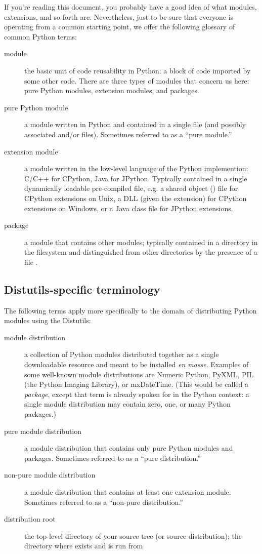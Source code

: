 \documentclass{howto}
\begin{document}
If you're reading this document, you probably have a good idea of what
modules, extensions, and so forth are.  Nevertheless, just to be sure
that everyone is operating from a common starting point, we offer the
following glossary of common Python terms:
\begin{description}
\item[module] the basic unit of code reusability in Python: a block of
  code imported by some other code.  There are three types of modules
  that concern us here: pure Python modules, extension modules, and
  packages.
\item[pure Python module] a module written in Python and contained in a
  single  file (and possibly associated  and/or
   files).  Sometimes referred to as a ``pure module.''
\item[extension module] a module written in the low-level language of
  the Python implemention: C/C++ for CPython, Java for JPython.
  Typically contained in a single dynamically loadable pre-compiled
  file, e.g. a shared object () file for CPython extensions on
  Unix, a DLL (given the  extension) for CPython extensions
  on Windows, or a Java class file for JPython extensions.
\item[package] a module that contains other modules; typically contained
  in a directory in the filesystem and distinguished from other
  directories by the presence of a file .
\end{description}


\subsection{Distutils-specific terminology}
\label{sec:distutils-term}

The following terms apply more specifically to the domain of
distributing Python modules using the Distutils:
\begin{description}
\item[module distribution] a collection of Python modules distributed
  together as a single downloadable resource and meant to be installed
  \emph{en masse}.  Examples of some well-known module distributions are
  Numeric Python, PyXML, PIL (the Python Imaging Library), or
  mxDateTime.  (This would be called a \emph{package}, except that term
  is already spoken for in the Python context: a single module
  distribution may contain zero, one, or many Python packages.)
\item[pure module distribution] a module distribution that contains only
  pure Python modules and packages.  Sometimes referred to as a ``pure
  distribution.''
\item[non-pure module distribution] a module distribution that contains
  at least one extension module.  Sometimes referred to as a ``non-pure
  distribution.''
\item[distribution root] the top-level directory of your source tree (or 
  source distribution); the directory where  exists and
  is run from
\end{description}
\end{document}
